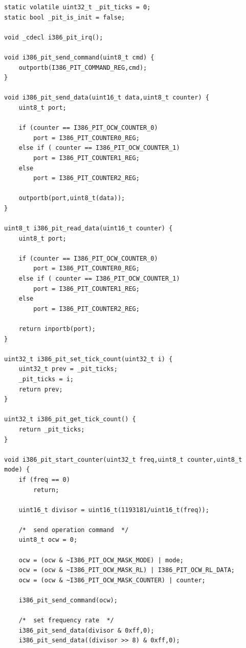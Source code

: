 \documentclass[document.tex]{subfiles}
\begin{document}
\begin{english}

\lstset{numberstyle=\tiny,numbers=left,stepnumber=1,numbersep=5pt,tabsize=2,extendedchars=true,breaklines=true,frame=b,showspaces=false, showtabs=false,xleftmargin=10pt,framexleftmargin=10pt,framexrightmargin=5pt,framexbottommargin=4pt,showstringspaces=false,language=C++}


\begin{lstlisting}[label=lst:pit_implementation,caption=\en{hal/pit.cpp: PIT Implementation}]
static volatile uint32_t _pit_ticks = 0;
static bool _pit_is_init = false;

void _cdecl i386_pit_irq();

void i386_pit_send_command(uint8_t cmd) {
	outportb(I386_PIT_COMMAND_REG,cmd);
}

void i386_pit_send_data(uint16_t data,uint8_t counter) {
	uint8_t port;
	
	if (counter == I386_PIT_OCW_COUNTER_0)
		port = I386_PIT_COUNTER0_REG;
	else if ( counter == I386_PIT_OCW_COUNTER_1)
		port = I386_PIT_COUNTER1_REG;
	else
		port = I386_PIT_COUNTER2_REG;
		
	outportb(port,uint8_t(data));
}

uint8_t i386_pit_read_data(uint16_t counter) {
	uint8_t port;
	
	if (counter == I386_PIT_OCW_COUNTER_0)
		port = I386_PIT_COUNTER0_REG;
	else if ( counter == I386_PIT_OCW_COUNTER_1)
		port = I386_PIT_COUNTER1_REG;
	else
		port = I386_PIT_COUNTER2_REG;
		
	return inportb(port);
}

uint32_t i386_pit_set_tick_count(uint32_t i) {
	uint32_t prev = _pit_ticks;
	_pit_ticks = i;
	return prev;
}

uint32_t i386_pit_get_tick_count() {
	return _pit_ticks;
}

void i386_pit_start_counter(uint32_t freq,uint8_t counter,uint8_t mode) {
	if (freq == 0)
		return;
	
	uint16_t divisor = uint16_t(1193181/uint16_t(freq));
	
	/*	send operation command	*/
	uint8_t ocw = 0;
	
	ocw = (ocw & ~I386_PIT_OCW_MASK_MODE) | mode;
	ocw = (ocw & ~I386_PIT_OCW_MASK_RL) | I386_PIT_OCW_RL_DATA;
	ocw = (ocw & ~I386_PIT_OCW_MASK_COUNTER) | counter;
	
	i386_pit_send_command(ocw);
	
	/*	set frequency rate	*/
	i386_pit_send_data(divisor & 0xff,0);
	i386_pit_send_data((divisor >> 8) & 0xff,0);
	

\end{lstlisting}
\end{english}
\end{document}
